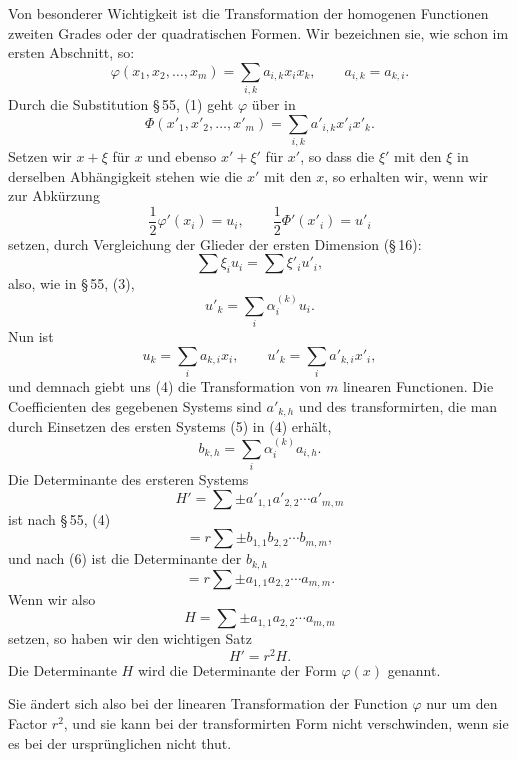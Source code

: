 \documentclass[11pt]{article}
\begin{document}
Von besonderer Wichtigkeit ist die Transformation der homogenen Functionen zweiten Grades oder der quadratischen Formen. Wir bezeichnen sie, wie schon im ersten Abschnitt, so:
\begin{equation}
 \varphi(x_1,x_2,\ldots,x_m)=\sum_{i,k}a_{i,k}x_i x_k,
 \qquad a_{i,k}=a_{k,i}.
\tag{1}
\end{equation}
Durch die Substitution \S\,55, (1) geht $\varphi$ über in
\begin{equation}
 \Phi(x'_1,x'_2,\ldots,x'_m)=\sum_{i,k}a'_{i,k}x'_i x'_k.
\tag{2}
\end{equation}
Setzen wir $x+\xi$ für $x$ und ebenso $x'+\xi'$ für $x'$, so dass die $\xi'$ mit den $\xi$ in derselben Abhängigkeit stehen wie die $x'$ mit den $x$, so erhalten wir, wenn wir zur Abkürzung
\[
 \frac12\varphi'(x_i)=u_i,
 \qquad
 \frac12\Phi'(x'_i)=u'_i
\]
setzen, durch Vergleichung der Glieder der ersten Dimension (\S\,16):
\begin{equation}
 \sum \xi_i u_i=\sum \xi'_i u'_i,
\tag{3}
\end{equation}
also, wie in \S\,55, (3),
\begin{equation}
 u'_k=\sum_i \alpha_i^{(k)}u_i.
\tag{4}
\end{equation}
Nun ist
\begin{equation}
 u_k=\sum_i a_{k,i}x_i,
 \qquad
 u'_k=\sum_i a'_{k,i}x'_i,
\tag{5}
\end{equation}
und demnach giebt uns (4) die Transformation von $m$ linearen Functionen. Die Coefficienten des gegebenen Systems sind $a'_{k,h}$ und des transformirten, die man durch Einsetzen des ersten Systems (5) in (4) erhält,
\begin{equation}
 b_{k,h}=\sum_i \alpha_i^{(k)}a_{i,h}.
\tag{6}
\end{equation}
Die Determinante des ersteren Systems
\[
 H'=\sum \pm a'_{1,1}a'_{2,2}\cdots a'_{m,m}
\]
ist nach \S\,55, (4)
\[
 =r\sum\pm b_{1,1}b_{2,2}\cdots b_{m,m},
\]
und nach (6) ist die Determinante der $b_{k,h}$
\[
 =r\sum\pm a_{1,1}a_{2,2}\cdots a_{m,m}.
\]
Wenn wir also
\begin{equation}
 H=\sum \pm a_{1,1}a_{2,2}\cdots a_{m,m}
\tag{7}
\end{equation}
setzen, so haben wir den wichtigen Satz
\begin{equation}
 H'=r^2H.
\tag{8}
\end{equation}
Die Determinante $H$ wird die Determinante der Form $\varphi(x)$ genannt.

Sie ändert sich also bei der linearen Transformation der Function $\varphi$ nur um den Factor $r^2$, und sie kann bei der transformirten Form nicht verschwinden, wenn sie es bei der ursprünglichen nicht thut.
\end{document}
